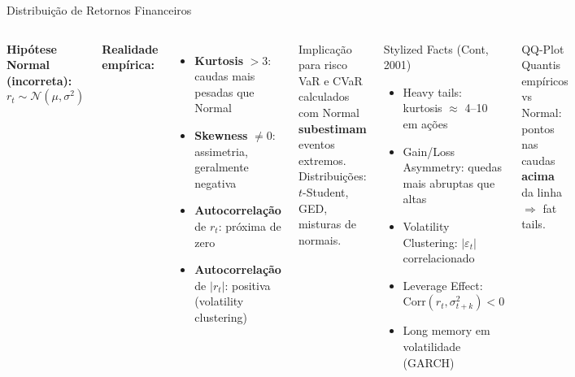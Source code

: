\documentclass[aspectratio=169,12pt]{beamer}
\begin{document}
\begin{frame}[fragile]{Distribuição de Retornos Financeiros}
\begin{columns}[T]

\textbf{Hipótese Normal (incorreta):}
\[ r_t \sim \mathcal{N}(\mu, \sigma^2) \]

\textbf{Realidade empírica:}
\begin{itemize}
  \item \textbf{Kurtosis} $> 3$: caudas mais pesadas que Normal
  \item \textbf{Skewness} $\neq 0$: assimetria, geralmente negativa
  \item \textbf{Autocorrelação} de $r_t$: próxima de zero
  \item \textbf{Autocorrelação} de $|r_t|$: positiva (volatility clustering)
\end{itemize}
\vspace{.3em}
\begin{alertblock}{Implicação para risco}
VaR e CVaR calculados com Normal \textbf{subestimam} eventos extremos.
Distribuições: $t$-Student, GED, misturas de normais.
\end{alertblock}
\begin{block}{Stylized Facts (Cont, 2001)}
\begin{itemize}
  \item Heavy tails: kurtosis $\approx$ 4--10 em ações
  \item Gain/Loss Asymmetry: quedas mais abruptas que altas
  \item Volatility Clustering: $|\varepsilon_t|$ correlacionado
  \item Leverage Effect: $\text{Corr}(r_t, \sigma_{t+k}^2) < 0$
  \item Long memory em volatilidade (GARCH)
\end{itemize}
\end{block}\vspace{.3em}
\begin{exampleblock}{QQ-Plot}
Quantis empíricos vs Normal: pontos nas caudas \textbf{acima} da linha $\Rightarrow$ fat tails.
\end{exampleblock}
\end{columns}
\end{frame}
\end{document}
